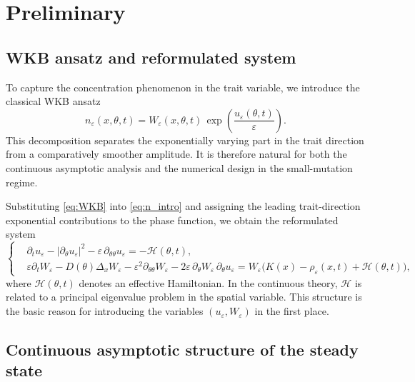\documentclass[11pt, dina4, amsfont12]{article}
\begin{document}
\section{Preliminary}

\subsection{WKB ansatz and reformulated system}

To capture the concentration phenomenon in the trait variable, we introduce the classical WKB ansatz
\begin{equation}\label{eq:WKB}
   n_\varepsilon(x,\theta,t)
   = W_\varepsilon(x,\theta,t)\,
   \exp\!\left(\frac{u_\varepsilon(\theta,t)}{\varepsilon}\right).
\end{equation}
This decomposition separates the exponentially varying part in the trait direction from a comparatively smoother amplitude. It is therefore natural for both the continuous asymptotic analysis and the numerical design in the small-mutation regime.

Substituting \eqref{eq:WKB} into \eqref{eq:n_intro} and assigning the leading trait-direction exponential contributions to the phase function, we obtain the reformulated system
\begin{equation}\label{eq:WKB_reformulation}
\left\{
\begin{aligned}
& \partial_t u_\varepsilon
- |\partial_\theta u_\varepsilon|^2
- \varepsilon \, \partial_{\theta\theta} u_\varepsilon
= - \mathcal H(\theta,t), \\
& \varepsilon \partial_t W_\varepsilon
- D(\theta)\Delta_x W_\varepsilon
- \varepsilon^2 \partial_{\theta\theta} W_\varepsilon
- 2\varepsilon \, \partial_\theta W_\varepsilon \, \partial_\theta u_\varepsilon
= W_\varepsilon\bigl(K(x)-\rho_\varepsilon(x,t)+\mathcal H(\theta,t)\bigr),
\end{aligned}
\right.
\end{equation}
where \(\mathcal H(\theta,t)\) denotes an effective Hamiltonian. In the continuous theory, \(\mathcal H\) is related to a principal eigenvalue problem in the spatial variable. This structure is the basic reason for introducing the variables \((u_\varepsilon,W_\varepsilon)\) in the first place.

\subsection{Continuous asymptotic structure of the steady state}\label{subsec:continuous_asymptotic_structure}
\end{document}
